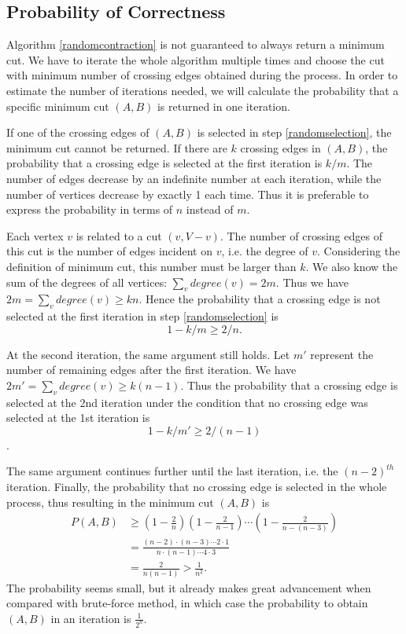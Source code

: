 \subsection{Probability of Correctness}
Algorithm \ref{randomcontraction} is not guaranteed to always return a minimum cut. We have to iterate the whole algorithm multiple times and choose the cut with minimum number of crossing edges obtained during the process. In order to estimate the number of iterations needed, we will calculate the probability that a specific minimum cut $(A,B)$ is returned in one iteration.

If one of the crossing edges of $(A,B)$ is selected in step \ref{randomselection}, the minimum cut cannot be returned. If there are $k$ crossing edges in $(A,B)$, the probability that a crossing edge is selected at the first iteration is $k/m$. The number of edges decrease by an indefinite number at each iteration, while the number of vertices decrease by exactly 1 each time. Thus it is preferable to express the probability in terms of $n$ instead of $m$.

Each vertex $v$ is related to a cut $({v},V-{v})$. The number of crossing edges of this cut is the number of edges incident on $v$, i.e. the degree of $v$. Considering the definition of minimum cut, this number must be larger than $k$. We also know the sum of the degrees of all vertices: $\sum\limits_{v}degree(v)=2m$. Thus we have $2m=\sum\limits_{v}degree(v)\geq kn$. Hence the probability that a crossing edge is not selected at the first iteration in step \ref{randomselection} is $$1-k/m\geq 2/n.$$

At the second iteration, the same argument still holds. Let $m'$ represent the number of remaining edges after the first iteration. We have $2m'=\sum\limits_{v}degree(v)\geq k(n-1)$. Thus the probability that a crossing edge is selected at the 2nd iteration under the condition that no crossing edge was selected at the 1st iteration is $$1-k/m'\geq 2/(n-1)$$.

The same argument continues further until the last iteration, i.e. the $(n-2)^{th}$ iteration. Finally, the probability that no crossing edge is selected in the whole process, thus resulting in the minimum cut $(A,B)$ is
\begin{align*}
P(A,B)&\geq\left(1-\frac{2}{n}\right)\left(1-\frac{2}{n-1}\right)\cdots\left(1-\frac{2}{n-(n-3)}\right)\\
&=\frac{(n-2)\cdot(n-3)\cdots 2\cdot 1}{n\cdot(n-1)\cdots 4\cdot 3}\\
&=\frac{2}{n(n-1)}>\frac{1}{n^2}.
\end{align*}
The probability seems small, but it already makes great advancement when compared with brute-force method, in which case the probability to obtain $(A,B)$ in an iteration is $\frac{1}{2^n}$.

